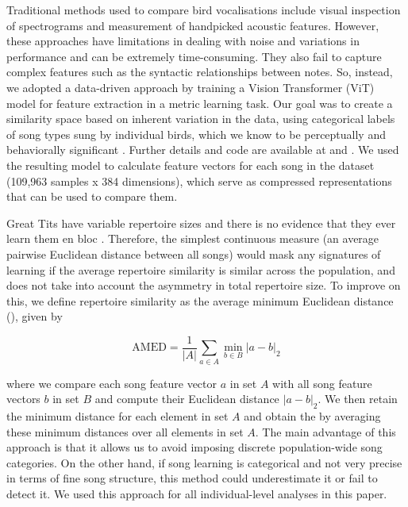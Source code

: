 Traditional methods used to compare bird vocalisations include visual inspection of spectrograms and measurement of handpicked acoustic features. However, these approaches have limitations in dealing with noise and variations in performance and can be extremely time-consuming. They also fail to capture complex features such as the syntactic relationships between notes. So, instead, we adopted a data-driven approach by training a Vision Transformer (ViT) model for feature extraction in a metric learning task. Our goal was to create a similarity space based on inherent variation in the data, using categorical labels of song types sung by individual birds, which we know to be perceptually and behaviorally significant \parencite{lind1996}. Further details and code are available at \parencite{merinorecalde2023} and \parencite{merinorecalde2023a}. We used the resulting model to calculate feature vectors for each song in the dataset (109,963 samples x 384 dimensions), which serve as compressed representations that can be used to compare them.

Great Tits have variable repertoire sizes and there is no evidence that they ever learn them en bloc \parencite{mcgregor1982b, rivera-gutierrez2010a}. Therefore, the simplest continuous measure (an average pairwise Euclidean distance between all songs) would mask any signatures of learning if the average repertoire similarity is similar across the population, and does not take into account the asymmetry in total repertoire size. To improve on this, we define repertoire similarity as the average minimum Euclidean distance (), given by

\begin{equation} 
\label{eq1}
\text{AMED} = \frac{1}{|A|} \sum_{a \in A} \min_{b \in B} \left| a - b \right|_2
\end{equation}


where we compare each song feature vector $a$ in set $A$ with all song feature vectors $b$ in set $B$ and compute their Euclidean distance $\left| a - b \right|_2$. We then retain the minimum distance for each element in set $A$ and obtain the  by averaging these minimum distances over all elements in set $A$.
The main advantage of this approach is that it allows us to avoid imposing discrete population-wide song categories. On the other hand, if song learning is categorical and not very precise in terms of fine song structure, this method could underestimate it or fail to detect it. We used this approach for all individual-level analyses in this paper. 

